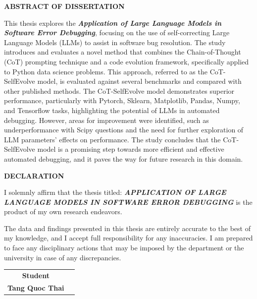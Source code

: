 \documentclass[a4paper,oneside]{book}
\begin{document}
\newpage
\begin{titlepage}
    \begin{center}
        \large\bf ABSTRACT OF DISSERTATION
    \end{center}
    This thesis explores the \textbf{\textit{Application of Large Language Models in Software Error Debugging}}, focusing on the use of self-correcting Large Language Models (LLMs) to assist in software bug resolution. The study introduces and evaluates a novel method that combines the Chain-of-Thought (CoT) prompting technique and a code evolution framework, specifically applied to Python data science problems. This approach, referred to as the CoT-SelfEvolve model, is evaluated against several benchmarks and compared with other published methods. The CoT-SelfEvolve model demonstrates superior performance, particularly with Pytorch, Sklearn, Matplotlib, Pandas, Numpy, and Tensorflow tasks, highlighting the potential of LLMs in automated debugging. However, areas for improvement were identified, such as underperformance with Scipy questions and the need for further exploration of LLM parameters' effects on performance. The study concludes that the CoT-SelfEvolve model is a promising step towards more efficient and effective automated debugging, and it paves the way for future research in this domain.
\end{titlepage}


\newpage
\begin{titlepage}
    \begin{center}
        \large\bf DECLARATION
    \end{center}
    I solemnly affirm that the thesis titled: \textbf{\textit{APPLICATION OF LARGE LANGUAGE MODELS IN SOFTWARE ERROR DEBUGGING}} is the product of my own research endeavors.

    The data and findings presented in this thesis are entirely accurate to the best of my knowledge, and I accept full responsibility for any inaccuracies. I am prepared to face any disciplinary actions that may be imposed by the department or the university in case of any discrepancies.

    \begin{flushright}
        \begin{tabular}{c c}
            \textbf{Student}        & \textbf{} \\[2cm]
            \textbf{Tang Quoc Thai} & \textbf{} \\
        \end{tabular}
    \end{flushright}
\end{titlepage}
\end{document}
